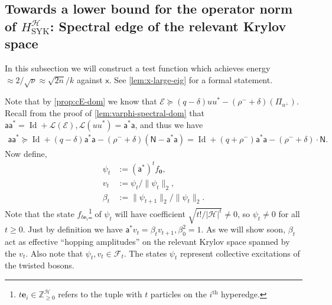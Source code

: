 \documentclass
[11pt,letterpaper]
{article}
\theoremstyle{definition}
\newcommand{\sfa}{\mathsf a}
\newcommand{\sfx}{\mathsf x}
\newcommand{\Num}{\mathsf N}
\newcommand{\cF}{{\mathcal F}}
\newcommand{\cE}{{\mathcal E}}
\newcommand{\1}{\mathbf{1}}
\newcommand{\Z}{\mathbb Z}
\newcommand{\cH}{\mathcal H}
\newcommand{\Id}{\operatorname{Id}}
\newcommand{\cL}{\mathcal L}
\renewcommand{\geq}{\geqslant}
\renewcommand{\ge}{\geqslant}
\renewcommand{\succeq}{\succcurlyeq}
\begin{document}
\subsection{Towards a lower bound for the operator norm of $H^{\cH}_{\operatorname{SYK}}$: Spectral edge of the relevant Krylov space}
In this subsection we will construct a test function which achieves energy $\approx 2/\sqrt\nu\approx \sqrt{2n}/k$ against $\sfx$. See \cref{lem:x-large-eig} for a formal statement.


Note that by \cref{prop:cE-dom} we know that $\cE\succeq(q - \delta)uu^* - (\rho^- + \delta)(\Pi_{u^\perp})$. Recall from the proof of \cref{lem:varphi-spectral-dom} that $\sfa\sfa^* = \Id + \cL(\cE), \cL(uu^*) = \sfa^*\sfa$, and thus we have 
\begin{align}\label{eq:aalowerbound}
    \sfa\sfa^*\succeq\Id + (q - \delta)\sfa^*\sfa - (\rho^- + \delta)(\Num - \sfa^*\sfa) = \Id + (q + \rho^-)\sfa^*\sfa - (\rho^- + \delta)\cdot\Num.
\end{align}
Now define,
\begin{align}\label{eq:radial-vec-def}
\psi_t&:=(\sfa^*)^tf_{\bm{0}},\\
v_t&:= \psi_t/\|\psi_t\|_2,\\
\beta_t&:=\|\psi_{t + 1}\|_2/\|\psi_t\|_2.
\end{align}
Note that the state $f_{t\bm e_i}$\footnote{$t\bm e_i\in\Z_{\geq 0}^\cH$ refers to the tuple with $t$ particles on the $i^{\mathrm{th}}$ hyperedge.} of $\psi_t$ will have coefficient $\sqrt{t!/|\cH|^{t}} \neq 0$, so $\psi_t\neq 0$ for all $t \ge 0$.  Just by definition we have $\sfa^*v_t = \beta_tv_{t + 1},\beta_0^2 = 1$. As we will show soon, $\beta_t$ act as effective ``hopping amplitudes'' on the relevant Krylov space spanned by the $v_t$. Also note that $\psi_t, v_t\in\cF_t$. The states $\psi_t$ represent collective excitations of the twisted bosons.
\end{document}

